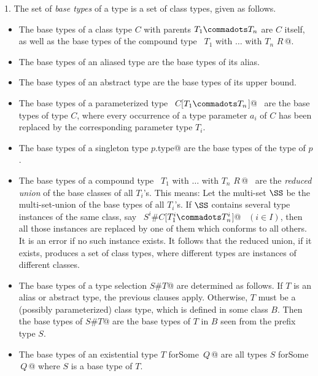 1. The set of {\em base types} of a type is a set of class types, 
given as follows.
\begin{itemize}
\item
The base types of a class type $C$ with parents $T_1 \commadots T_n$ are
$C$ itself, as well as the base types of the compound type
~\lstinline@$T_1$ with $\ldots$ with $T_n$ {$R\,$}@.
\item
The base types of an aliased type are the base types of its alias.
\item
The base types of an abstract type are the base types of its upper bound.
\item
The base types of a parameterized type 
~\lstinline@$C$[$T_1 \commadots T_n$]@~ are the base types
of type $C$, where every occurrence of a type parameter $a_i$ 
of $C$ has been replaced by the corresponding parameter type $T_i$.
\item
The base types of a singleton type \lstinline@$p$.type@ are the base types of
the type of $p$.
\item
The base types of a compound type 
~\lstinline@$T_1$ with $\ldots$ with $T_n$ {$R\,$}@~ 
are the {\em reduced union} of the base
classes of all $T_i$'s. This means: 
Let the multi-set $\SS$ be the multi-set-union of the
base types of all $T_i$'s.
If $\SS$ contains several type instances of the same class, say
~\lstinline@$S^i$#$C$[$T^i_1 \commadots T^i_n$]@~ $(i \in I)$, then
all those instances 
are replaced by one of them which conforms to all
others. It is an error if no such instance exists. It follows that the reduced union, if it exists,
produces a set of class types, where different types are instances of different classes.
\item
The base types of a type selection \lstinline@$S$#$T$@ are
determined as follows. If $T$ is an alias or abstract type, the
previous clauses apply. Otherwise, $T$ must be a (possibly
parameterized) class type, which is defined in some class $B$.  Then
the base types of \lstinline@$S$#$T$@ are the base types of $T$
in $B$ seen from the prefix type $S$.
\item
The base types of an existential type \lstinline@$T$ forSome {$\,Q\,$}@ are
all types \lstinline@$S$ forSome {$\,Q\,$}@ where $S$ is a base type of $T$.
\end{itemize}

